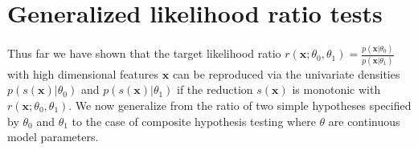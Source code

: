 \documentclass[12pt]{article}
\numberwithin{equation}{section}
\theoremstyle{plain}
\begin{document}


\section{Generalized likelihood ratio tests}
\label{sec:generalized-likelihood-ratio}


Thus far we have shown that the target likelihood ratio
$r(\mathbf{x};\theta_0,\theta_1)=\frac{p(\mathbf{x}|\theta_0)}{p(\mathbf{x}|\theta_1)}$
with high dimensional features $\mathbf{x}$ can be reproduced via the univariate
densities $p(s(\mathbf{x})|\theta_0)$ and $p(s(\mathbf{x})|\theta_1)$ if the
reduction $s(\mathbf{x})$ is monotonic with $r(\mathbf{x};\theta_0,\theta_1)$.
We now generalize from the ratio of two simple hypotheses specified by
$\theta_0$ and $\theta_1$ to the case of composite hypothesis testing where
$\theta$ are continuous model parameters.
%
%
%
%
\end{document}
